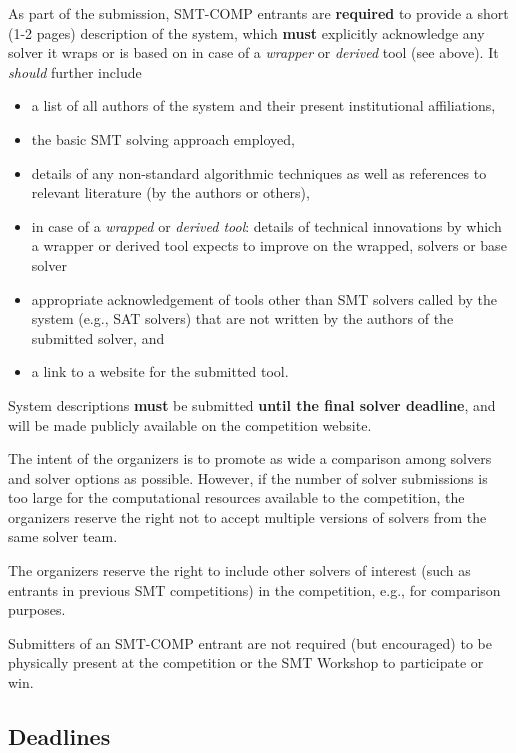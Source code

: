 \documentclass[12pt]{article}
\begin{document}
%
As part of the submission, SMT-COMP entrants are \textbf{required} to provide a
short (1-2 pages) description of the system, which \textbf{must} explicitly
acknowledge any solver it wraps or is based on in case of a \emph{wrapper} or
\emph{derived} tool (see above).
It \emph{should} further include
\begin{itemize}[itemsep=0ex]
  \item a list of all authors of the system and their present institutional
    affiliations,
  \item the basic SMT solving approach employed,
  \item details of any non-standard algorithmic techniques as well as
    references to relevant literature (by the authors or others),
  \item in case of a \emph{wrapped} or \emph{derived tool}: details of
    technical innovations by which a wrapper or derived tool expects to improve
    on the wrapped,
    solvers or base solver
  \item appropriate acknowledgement of tools other than SMT solvers called by
    the system (e.g., SAT solvers) that are not written by the authors of the
    submitted solver, and
  \item a link to a website for the submitted tool.
\end{itemize}
System descriptions \textbf{must} be submitted \textbf{until the final solver
deadline}, and will be made publicly available on the competition website.

%
The intent of the organizers is to promote as wide a comparison among
solvers and solver options as possible.  However, if the number of
solver submissions is too large for the computational resources
available to the competition, the organizers reserve the right not to
accept multiple versions of solvers from the same solver team.

%
The organizers reserve the right to include other solvers of interest
(such as entrants in previous SMT competitions) in the competition,
e.g., for comparison purposes.

%
Submitters of an SMT-COMP entrant are not required (but encouraged) to be
physically present at the competition or the SMT Workshop to participate or
win.


\subsection*{Deadlines}
\end{document}
